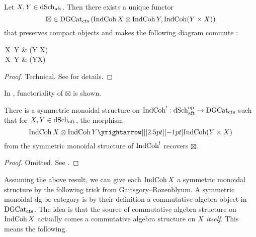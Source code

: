 \documentclass[./main.tex]{subfiles}
\begin{document}
\begin{prop}

  Let $X , Y \in \mathrm{dSch}_{\mathrm{aft}}$. 
  Then there exists a unique functor
  \[
    \boxtimes \in \mathrm{DGCat}_{\mathrm{cts}}\left(
      \mathrm{IndCoh}\,X \otimes \mathrm{IndCoh}\,Y , \mathrm{IndCoh}(Y \times X)
    \right)
  \]
  that preserves compact objects and makes the following diagram commute : 
  \begin{cd}
    {\INDCOH\,X \otimes \INDCOH\,Y} & {\INDCOH(Y \times X)} \\
    {\QCOH\,X \otimes \QCOH\,Y} & {\QCOH(Y\times X)}
    \arrow["{\Psi_X \otimes \Psi_Y}"', from=1-1, to=2-1]
    \arrow["\boxtimes"', from=2-1, to=2-2]
    \arrow["{\Psi_{Y \times X}}", from=1-2, to=2-2]
    \arrow["\boxtimes", from=1-1, to=1-2]
  \end{cd}
\end{prop}
\begin{proof}
  Technical. See \cite[Ch 4 , 6.3.2]{GR1} for details.
\end{proof}

In \cite[Ch 5 , 4.1]{GR1}, functoriality of $\boxtimes$ is shown.
\begin{prop}
 
  There is a symmetric monoidal structure on 
  $\mathrm{IndCoh}^! : \mathrm{dSch}_{\mathrm{aft}}^{\mathrm{op}} \to \mathrm{DGCat}_{\mathrm{cts}}$ 
  such that for $X , Y \in \mathrm{dSch}_{\mathrm{aft}}$,
  the morphism \[
    \INDCOH\,X \otimes \INDCOH\,Y \map{}{} \INDCOH(Y \times X)
  \]
  from the symmetric monoidal structure of $\mathrm{IndCoh}^!$
  recovers $\boxtimes$. 
\end{prop}
\begin{proof}
  Omitted. See \cite[Ch 5 , 4.1]{GR1}.
\end{proof}

\begin{rmk}
  
  Assuming the above result,
  we can give each $\mathrm{IndCoh}\,X$ a symmetric monoidal structure
  by the following trick from Gaitsgory--Rozenblyum.
  A symmetric monoidal dg-$\infty$-category is by their definition
  a commutative algebra object in $\mathrm{DGCat}_{\mathrm{cts}}$.
  The idea is that the source of commutative algebra structure on 
  $\mathrm{IndCoh}\,X$ actually comes a commutative algebra structure on
  \emph{$X$ itself}.
  This means the following.
  
\end{rmk}
\end{document}
